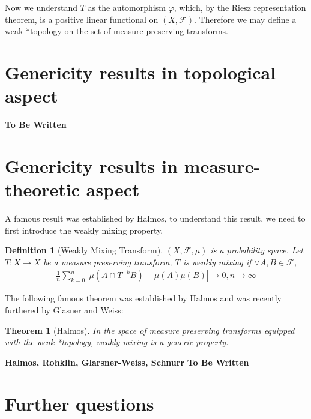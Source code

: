 \documentclass{article}
\newtheorem{definition}{Definition}
\newtheorem{theorem}{Theorem}
\begin{document}
\begin{CJK}{UTF8}{gbsn}
Now we understand $T$ as the automorphism $\varphi$, which, by the Riesz representation theorem, is a positive linear functional on $(X,\mathscr{F})$. Therefore we may define a weak-*topology on the set of measure preserving transforms.

\section{Genericity results in topological aspect}




\textbf{To Be Written}





\section{Genericity results in measure-theoretic aspect}

A famous result was established by Halmos, to understand this result, we need to first introduce the weakly mixing property.

\begin{definition}[Weakly Mixing Transform]
	$(X,\mathscr{F},\mu)$ is a probability space. Let $T:X\rightarrow X$ be a measure preserving transform, $T$ is weakly mixing if $\forall A,B\in\mathscr{F}$,
	\begin{align*}
		\frac{1}{n}\sum_{k=0}^n|\mu(A\cap T^{-k}B)-\mu(A)\mu(B)|\rightarrow 0,n\rightarrow \infty
	\end{align*}
\end{definition}

The following famous theorem was established by Halmos\cite{Halmos} and was recently furthered by Glasner and Weiss\cite{Glasner}:

\begin{theorem}[Halmos]
	In the space of measure preserving transforms equipped with the weak-*topology, weakly mixing is a generic property.
\end{theorem}

\textbf{Halmos, Rohklin, Glarsner-Weiss, Schnurr}
\textbf{To Be Written}









\section{Further questions}


\end{CJK}
\end{document}
